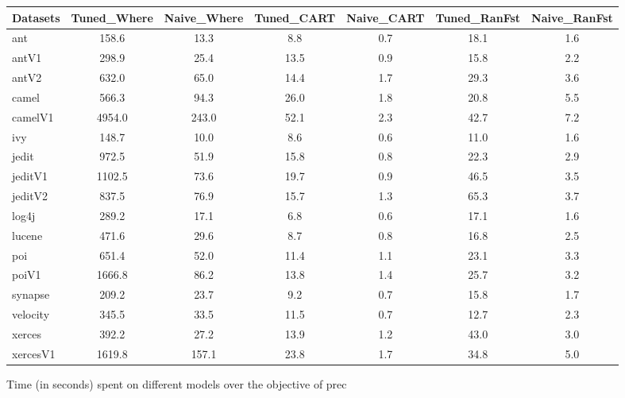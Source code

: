 \documentclass{sig-alternative}
\begin{document}
\begin{figure}[!ht]
\scriptsize
\centering
  \begin{tabular}{l|c |c |c |c |c |c }
    \hline\hline
    Datasets & Tuned\_Where & Naive\_Where & Tuned\_CART & Naive\_CART & Tuned\_RanFst & Naive\_RanFst\\
    \hline
    ant & 158.6 & 13.3 & 8.8 & 0.7 & 18.1 & 1.6\\
    antV1 & 298.9 & 25.4 & 13.5 & 0.9 & 15.8 & 2.2\\
    antV2 & 632.0 & 65.0 & 14.4 & 1.7 & 29.3 & 3.6\\
    camel & 566.3 & 94.3 & 26.0 & 1.8 & 20.8 & 5.5\\
    camelV1 & 4954.0 & 243.0 & 52.1 & 2.3 & 42.7 & 7.2\\
    ivy & 148.7 & 10.0 & 8.6 & 0.6 & 11.0 & 1.6\\
    jedit & 972.5 & 51.9 & 15.8 & 0.8 & 22.3 & 2.9\\
    jeditV1 & 1102.5 & 73.6 & 19.7 & 0.9 & 46.5 & 3.5\\
    jeditV2 & 837.5 & 76.9 & 15.7 & 1.3 & 65.3 & 3.7\\
    log4j & 289.2 & 17.1 & 6.8 & 0.6 & 17.1 & 1.6\\
    lucene & 471.6 & 29.6 & 8.7 & 0.8 & 16.8 & 2.5\\
    poi & 651.4 & 52.0 & 11.4 & 1.1 & 23.1 & 3.3\\
    poiV1 & 1666.8 & 86.2 & 13.8 & 1.4 & 25.7 & 3.2\\
    synapse & 209.2 & 23.7 & 9.2 & 0.7 & 15.8 & 1.7\\
    velocity & 345.5 & 33.5 & 11.5 & 0.7 & 12.7 & 2.3\\
    xerces & 392.2 & 27.2 & 13.9 & 1.2 & 43.0 & 3.0\\
    xercesV1 & 1619.8 & 157.1 & 23.8 & 1.7 & 34.8 & 5.0\\
  \end{tabular}
  \caption{Time (in seconds) spent on different models over the objective of prec}
\end{figure}
\end{document}
